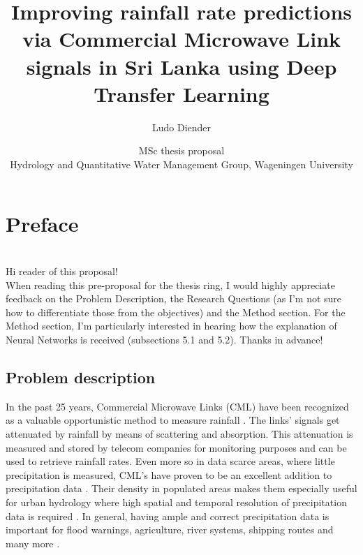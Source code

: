 \documentclass[twocolumn, 10pt, a4paper]{article}
\begin{document}
	\chapter{\textbf{Preface}}
	\\
	Hi reader of this proposal!\\	
	When reading this pre-proposal for the thesis ring, I would highly appreciate feedback on the Problem Description, the Research Questions (as I'm not sure how to differentiate those from the objectives) and the Method section. For the Method section, I'm particularly interested in hearing how the explanation of Neural Networks is received (subsections 5.1 and 5.2). Thanks in advance!
	
	\title{\vspace{-1cm}\Huge{Improving rainfall rate predictions via Commercial Microwave Link signals in Sri Lanka using Deep Transfer Learning}}
	\author{\Large{Ludo Diender}}
	\date{\normalsize{MSc thesis proposal\\
			Hydrology and Quantitative Water Management Group,
			Wageningen University}}
	
	\maketitle
	
	\section{Problem description}
	
	In the past 25 years, Commercial Microwave Links (CML) have been recognized as a valuable opportunistic method to measure rainfall \cite{Leijnse2007} \cite{Ruf1996}. The links' signals get attenuated by rainfall by means of scattering and absorption. This attenuation is measured and stored by telecom companies for monitoring purposes and can be used to retrieve rainfall rates. Even more so in data scarce areas, where little precipitation is measured, CML's have proven to be an excellent addition to precipitation data \cite{Overeem2021,Doumounia2014,Diba2021}. Their density in populated areas makes them especially useful for urban hydrology where high spatial and temporal resolution of precipitation data is required \cite{Overeem2011}. In general, having ample and correct precipitation data is important for flood warnings, agriculture, river systems, shipping routes and many more \cite{Chwala2019}. 
	
\end{document}
